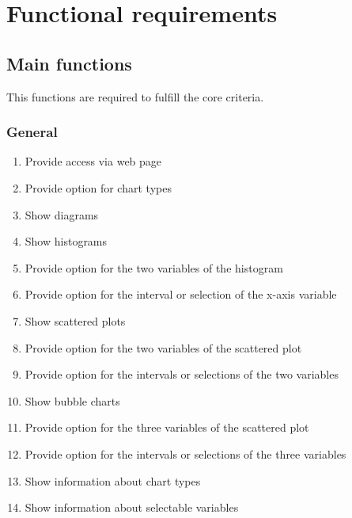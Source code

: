 \section{Functional requirements}


\renewcommand{\theenumi}{/F\arabic{enumi}0/}
\renewcommand{\labelenumi}{\theenumi}

  
\subsection{Main functions}

This functions are required to fulfill the core criteria.
 
\subsubsection*{General}
\begin{enumerate}
  \item Provide access via web page\label{f1}
    
  \item Provide option for chart types\label{f2}
  
  \item Show diagrams\label{f3}
  
  \item Show histograms\label{f4} %
  
  \item Provide option for the two variables of the histogram\label{f5}
  
  \item Provide option for the interval 
  or selection of the x-axis variable\label{f6} %
  
  \item Show scattered plots\label{f7} %
  
  \item Provide option for the 
  two variables of the scattered plot\label{f8}
  
  \item Provide option for the intervals 
  or selections of the two variables\label{f9} %
  
  \item Show bubble charts\label{f10} %
  
  \item Provide option for the three variables
   of the scattered plot\label{f11}
  
  \item Provide option for the intervals 
  or selections of the three variables\label{f12} %
  
  \item Show information about chart types\label{f13}
  
  \item Show information about selectable variables\label{f14}
  
\end{enumerate}


